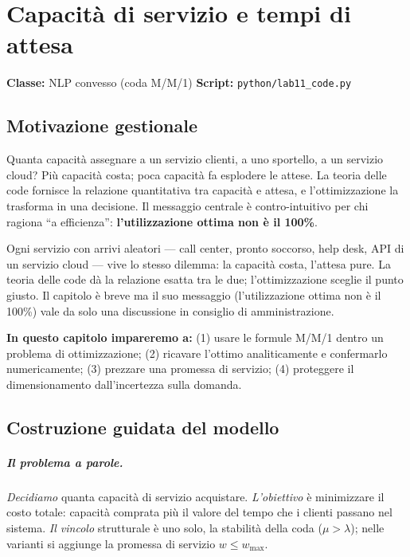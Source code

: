 \chapter{Capacità di servizio e tempi di attesa}
\label{cap:code}

\noindent\textbf{Classe:} NLP convesso (coda M/M/1) \hfill
\textbf{Script:} \texttt{python/lab11\_code.py}

\section{Motivazione gestionale}

Quanta capacità assegnare a un servizio clienti, a uno sportello, a un servizio cloud?
Più capacità costa; poca capacità fa esplodere le attese. La teoria delle code fornisce
la relazione quantitativa tra capacità e attesa, e l'ottimizzazione la trasforma in una
decisione. Il messaggio centrale è contro-intuitivo per chi ragiona ``a efficienza'':
\textbf{l'utilizzazione ottima non è il 100\%}.



Ogni servizio con arrivi aleatori --- call center, pronto soccorso, help desk,
API di un servizio cloud --- vive lo stesso dilemma: la capacità costa, l'attesa
pure. La teoria delle code dà la relazione esatta tra le due; l'ottimizzazione
sceglie il punto giusto. Il capitolo è breve ma il suo messaggio (l'utilizzazione
ottima non è il 100\%) vale da solo una discussione in consiglio di
amministrazione.

\textbf{In questo capitolo impareremo a:} (1) usare le formule M/M/1 dentro un
problema di ottimizzazione; (2) ricavare l'ottimo analiticamente e confermarlo
numericamente; (3) prezzare una promessa di servizio; (4) proteggere il
dimensionamento dall'incertezza sulla domanda.

\section{Costruzione guidata del modello}

\paragraph{Il problema a parole.} \emph{Decidiamo} quanta capacità di servizio
acquistare. \emph{L'obiettivo} è minimizzare il costo totale: capacità comprata più
il valore del tempo che i clienti passano nel sistema. \emph{Il vincolo} strutturale
è uno solo, la stabilità della coda ($\mu > \lambda$); nelle varianti si aggiunge la
promessa di servizio $w \le w_{\max}$.

